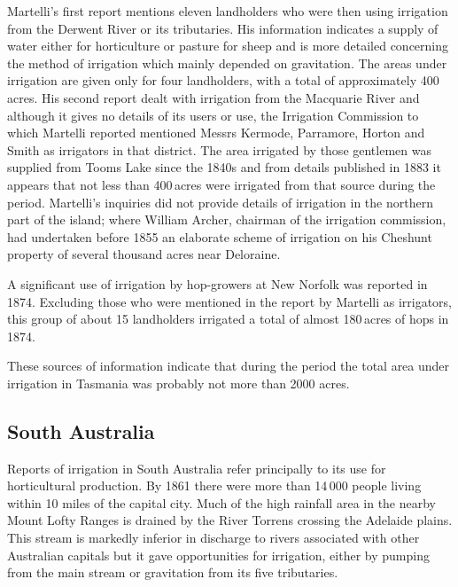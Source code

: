 Martelli's first report mentions eleven landholders who were then
using irrigation from the Derwent River or its tributaries.  His
information indicates a supply of water either for horticulture or
pasture for sheep and is more detailed concerning the method of
irrigation which mainly depended on gravitation.  The areas under
irrigation are given only for four landholders, with a total of
approximately 400\,acres.  His second report dealt with irrigation
from the Macquarie River and although it gives no details of its users
or use, the Irrigation Commission to which Martelli reported mentioned
Messrs Kermode, Parramore, Horton and Smith as irrigators in that
district.  The area irrigated by those gentlemen was supplied from
Tooms Lake  since the 1840s and from details
published in 1883 it appears that not less than 400\,acres were
irrigated from that source during the period.  Martelli's inquiries
did not provide details of irrigation in the northern part of the
island; where William Archer,  chairman of the
irrigation commission, had undertaken before 1855 an elaborate scheme
of irrigation on his Cheshunt property of several thousand acres near
Deloraine.

A significant use of irrigation by hop-growers  at New
Norfolk was reported in 1874.  Excluding those who were mentioned in
the report by Martelli as irrigators, this group of about 15
landholders irrigated a total of almost 180\,acres of hops in
1874.

These sources of information indicate that during the period the total
area under irrigation in Tasmania was probably not more than 2000
acres.

\subsection*{South Australia}

Reports of irrigation in South Australia  refer
principally to its use for horticultural production.  By 1861 there
were more than 14\,000 people living within 10 miles of the capital
city.  Much of the high rainfall area in the nearby Mount Lofty Ranges
is drained by the River Torrens  crossing the
Adelaide  plains.  This stream is markedly inferior in
discharge to rivers associated with other Australian capitals but it
gave opportunities for irrigation, either by pumping from the main
stream or gravitation from its five
tributaries.

